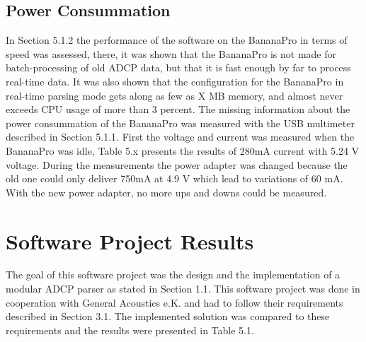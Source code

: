 \subsection{Power Consummation}
In Section 5.1.2 the performance of the software on the BananaPro in terms of speed was assessed, there, it was shown that the BananaPro is not made for batch-processing of old ADCP data, but that it is fast enough by far to process real-time data. It was also shown that the configuration for the BananaPro in real-time parsing mode gets along as few as X MB memory, and almost never exceeds CPU usage of more than 3 percent. 
The missing information about the power consummation of the BananaPro was measured with the USB  multimeter described in Section 5.1.1. First the voltage and current was measured when the BananaPro was idle, Table 5.x presents the results of 280mA current with 5.24 V voltage. During the measurements the power adapter was changed because the old one could only deliver 750mA at 4.9 V which lead to variations of 60 mA. With the new power adapter, no more ups and downs could be measured.\\


\section{Software Project Results}
The goal of this software project was the design and the implementation of a modular ADCP parser as stated in Section 1.1. This software project was done in cooperation with General Acoustics e.K. and had to follow their requirements described in Section 3.1. The implemented solution was compared to these requirements and the results were presented in Table 5.1.

